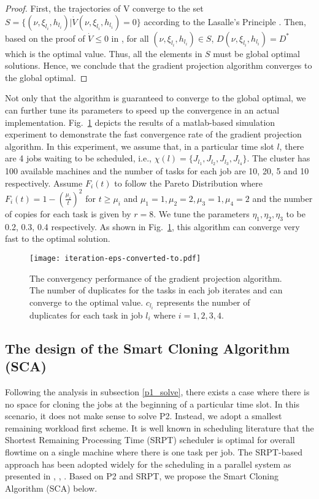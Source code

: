 \documentclass[10pt,conference]{IEEEtran}
\begin{document}
\begin{proof}
First, the trajectories of V converge to the set $ S = \{(\nu,\xi_{l_i},h_{l_i})|\dot{V}(\nu,\xi_{l_i},h_{l_i}) = 0\}$ according to the Lasalle's Principle {\cite{Control}}.  Then, based on the proof of $\dot{V} \leq 0$ in \cite{speculative-multi-job}, for all $(\nu,\xi_{l_i},h_{l_i}) \in S$, $D(\nu,\xi_{l_i},h_{l_i}) = D^*$ which is the optimal value. Thus, all the elements in $S$ must be global optimal solutions. Hence, we conclude that the gradient projection algorithm converges to the global optimal.
\end{proof}
Not only that the algorithm is guaranteed to converge to the global optimal, we can further tune its parameters to speed up the convergence in an actual implementation.
Fig.~\ref{converge} depicts the results of a matlab-based simulation experiment to demonstrate the fast convergence rate of the gradient projection algorithm.  In this experiment, we assume that, in a particular time slot $l$, there are 4 jobs waiting to be scheduled, i.e., $\chi(l) =  \{J_{l_1}, J_{l_2}, J_{l_3}, J_{l_4}\}$.  The cluster has 100 available machines and the number of tasks for each job are 10, 20, 5 and 10 respectively. Assume $F_i(t)$ to follow the Pareto Distribution where $F_i(t) = 1-(\frac{\mu_i}{t})^{2}$ for $t \geq \mu_i$ and $\mu_1 = 1, \mu_2 = 2, \mu_3 = 1, \mu_4 = 2$ and the number of copies for each task is given by $r = 8$. We tune the parameters $\eta_1, \eta_2,\eta_3$ to be 0.2, 0.3, 0.4 respectively. As shown in Fig.~\ref{converge}, this algorithm can converge very fast to the optimal solution.
\begin{figure}
\centering
\texttt{[image: iteration-eps-converted-to.pdf]}
\caption{The convergency performance of the gradient projection algorithm. The number of duplicates for the tasks in each job iterates and can converge to the optimal value. $c_{l_i}$ represents the number of duplicates for each task in job $l_i$ where $i = 1,2,3,4$.}
\label{converge}
\vspace{-0.2 cm}
\end{figure}

\subsection{The design of the Smart Cloning Algorithm (SCA)}
Following the analysis in subsection \ref{p1_solve}, there exists a case where there is no space for cloning the jobs at the beginning of a particular time slot. In this scenario, it does not make sense to solve P2. Instead,  we adopt a smallest remaining workload first scheme. It is well known in scheduling literature that the  Shortest Remaining Processing Time (SRPT) scheduler is optimal for overall flowtime on a single machine where there is one task per job. The SRPT-based approach has been adopted widely for the scheduling in a parallel system as presented in {\cite{Fast_Completion}}{\cite{Joint_Phase}}, {\cite{Flow_Shops}} {\cite{Delay_Tails}} {\cite{Data_Locality}} {\cite{Degree_Locality}}, {\cite{Schedulers}}. Based on P2 and SRPT, we propose the Smart Cloning Algorithm (SCA) below.
\end{document}
